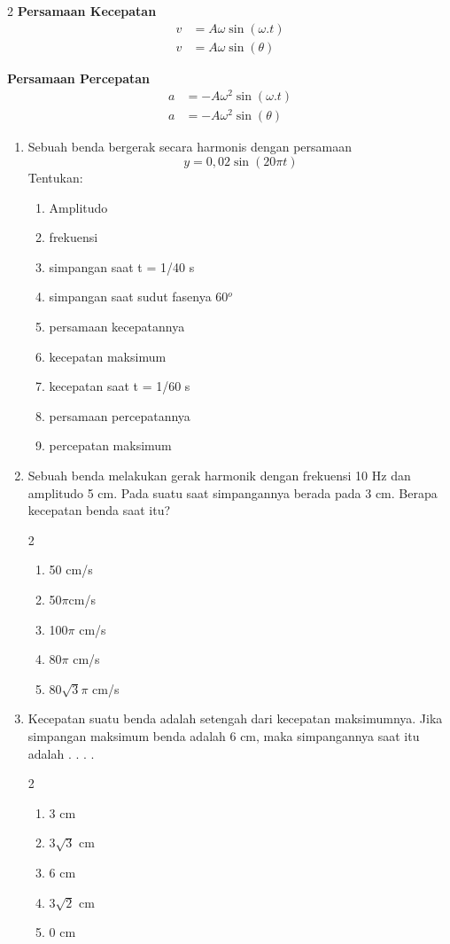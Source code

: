 \documentclass[10pt,a4paper]{extarticle}
\newcommand{\pilgani}[1]{                            \vspace{-0.3cm}\begin{multicols}{2}
 \begin{enumerate}[label=\Alph*., itemsep=0pt,topsep=0pt,leftmargin=*,align=Center]#1                     \end{enumerate}
 \phantom{ini cuma sapi, wedus, dan ayam}
 \end{multicols}}
\begin{document}
\begin{multicols*}{2}
\textbf{Persamaan Kecepatan}
\begin{align*}
v&=A\omega \sin(\omega.t)\\
v&=A\omega\sin(\theta)
\end{align*}

\textbf{Persamaan Percepatan}
\begin{align*}
a &= -A\omega^2\sin(\omega.t)\\
a &= -A\omega^2\sin(\theta)
\end{align*}



\begin{enumerate}
\item Sebuah benda bergerak secara harmonis dengan persamaan $$y = 0,02 \sin (20\pi t) $$
Tentukan:
\begin{enumerate}[label=\alph*.]
\item Amplitudo
\item frekuensi
\item simpangan saat t = 1/40 s
\item simpangan saat sudut fasenya 60$^o$
\item persamaan kecepatannya
\item kecepatan maksimum
\item kecepatan saat t = 1/60 s
\item persamaan percepatannya
\item percepatan maksimum
\end{enumerate}
\vspace{6cm}

\item Sebuah benda melakukan gerak harmonik dengan frekuensi 10 Hz dan amplitudo 5 cm. Pada suatu saat simpangannya berada pada 3 cm. Berapa kecepatan benda saat itu?
\pilgani{
\item 50 cm/s
\item 50$\pi$cm/s
\item 100$\pi$ cm/s
\item 80$\pi$ cm/s
\item 80$\sqrt{3}\pi$ cm/s
}
\vspace{3cm}

\item Kecepatan suatu benda adalah setengah dari kecepatan maksimumnya. Jika simpangan maksimum benda adalah 6 cm, maka simpangannya saat itu adalah . . . .
\pilgani{
\item 3 cm
\item 3$\sqrt{3}$ cm
\item 6 cm
\item 3$\sqrt{2}$ cm
\item 0 cm
}
\vspace{5cm}


\end{enumerate}
\end{multicols*}
\end{document}

